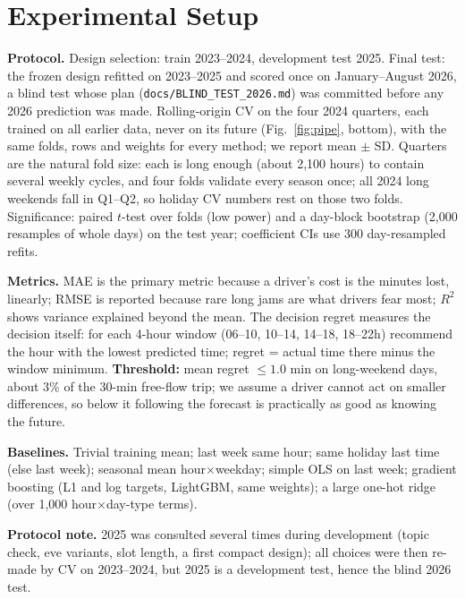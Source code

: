 \documentclass[11pt]{article}
\begin{document}
\section{Experimental Setup}
\textbf{Protocol.} Design selection: train 2023--2024, development test 2025. Final test: the frozen design refitted on 2023--2025 and scored once on January--August 2026, a blind test whose plan (\texttt{docs/BLIND\_TEST\_2026.md}) was committed before any 2026 prediction was made. Rolling-origin CV on the four 2024 quarters, each trained on all earlier data, never on its future (Fig.~\ref{fig:pipe}, bottom), with the same folds, rows and weights for every method; we report mean $\pm$ SD. Quarters are the natural fold size: each is long enough (about 2,100 hours) to contain several weekly cycles, and four folds validate every season once; all 2024 long weekends fall in Q1--Q2, so holiday CV numbers rest on those two folds. Significance: paired $t$-test over folds (low power) and a day-block bootstrap (2,000 resamples of whole days) on the test year; coefficient CIs use 300 day-resampled refits.

\noindent\textbf{Metrics.} MAE is the primary metric because a driver's cost is the minutes lost, linearly; RMSE is reported because rare long jams are what drivers fear most; $R^2$ shows variance explained beyond the mean. The decision regret measures the decision itself: for each 4-hour window (06--10, 10--14, 14--18, 18--22h) recommend the hour with the lowest predicted time; regret = actual time there minus the window minimum. \textbf{Threshold:} mean regret $\le1.0$ min on long-weekend days, about 3\% of the 30-min free-flow trip; we assume a driver cannot act on smaller differences, so below it following the forecast is practically as good as knowing the future.

\noindent\textbf{Baselines.} Trivial training mean; last week same hour; same holiday last time (else last week); seasonal mean hour$\times$weekday; simple OLS on last week; gradient boosting (L1 and log targets, LightGBM, same weights); a large one-hot ridge (over 1,000 hour$\times$day-type terms).

\noindent\textbf{Protocol note.} 2025 was consulted several times during development (topic check, eve variants, slot length, a first compact design); all choices were then re-made by CV on 2023--2024, but 2025 is a development test, hence the blind 2026 test.
\end{document}
